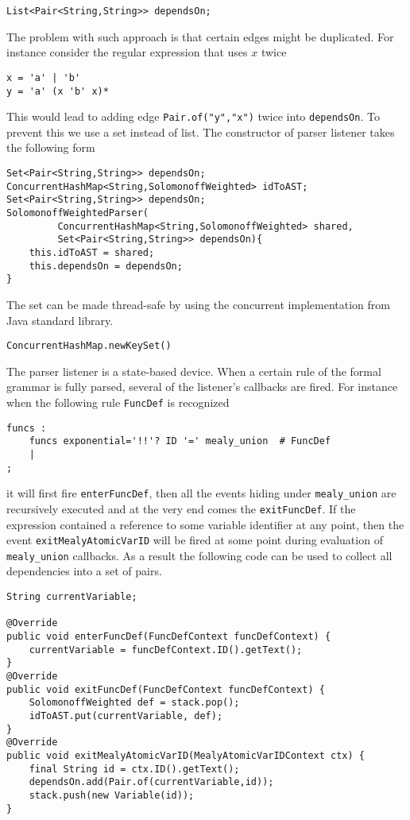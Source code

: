 \begin{lstlisting}
List<Pair<String,String>> dependsOn;
\end{lstlisting}     
The problem with such approach is that certain edges might be duplicated. For instance consider the regular expression that uses $x$ twice
\begin{lstlisting}
x = 'a' | 'b'
y = 'a' (x 'b' x)*
\end{lstlisting}
This would lead to adding edge \texttt{Pair.of("y","x")} twice into \texttt{dependsOn}. To prevent this we use a set instead of list. The constructor of parser listener takes the following form
\begin{lstlisting}
Set<Pair<String,String>> dependsOn;
ConcurrentHashMap<String,SolomonoffWeighted> idToAST;
Set<Pair<String,String>> dependsOn;
SolomonoffWeightedParser(
         ConcurrentHashMap<String,SolomonoffWeighted> shared,
         Set<Pair<String,String>> dependsOn){
    this.idToAST = shared;
    this.dependsOn = dependsOn;
}
\end{lstlisting}
The set can be made thread-safe by using the concurrent implementation from Java standard library.
\begin{lstlisting}
ConcurrentHashMap.newKeySet()
\end{lstlisting}
The parser listener is a state-based device. When a certain rule of the formal grammar is fully parsed, several of the listener's callbacks are fired. For instance when the following rule \texttt{FuncDef} is recognized
\begin{lstlisting}
funcs :
    funcs exponential='!!'? ID '=' mealy_union  # FuncDef
    | 
;
\end{lstlisting} 
it will first fire \texttt{enterFuncDef}, then all the events hiding under \texttt{mealy\_union} are recursively executed and at the very end comes the \texttt{exitFuncDef}. If the expression contained a reference to some variable identifier at any point, then the event \texttt{exitMealyAtomicVarID} will be fired at some point during evaluation of \texttt{mealy\_union} callbacks. As a result the following code can be used to collect all dependencies into a set of pairs.
\begin{lstlisting}
String currentVariable;

@Override
public void enterFuncDef(FuncDefContext funcDefContext) {
    currentVariable = funcDefContext.ID().getText();
}
@Override
public void exitFuncDef(FuncDefContext funcDefContext) {
    SolomonoffWeighted def = stack.pop();
    idToAST.put(currentVariable, def);
}
@Override
public void exitMealyAtomicVarID(MealyAtomicVarIDContext ctx) {
    final String id = ctx.ID().getText();
    dependsOn.add(Pair.of(currentVariable,id));
    stack.push(new Variable(id));
}
\end{lstlisting}
